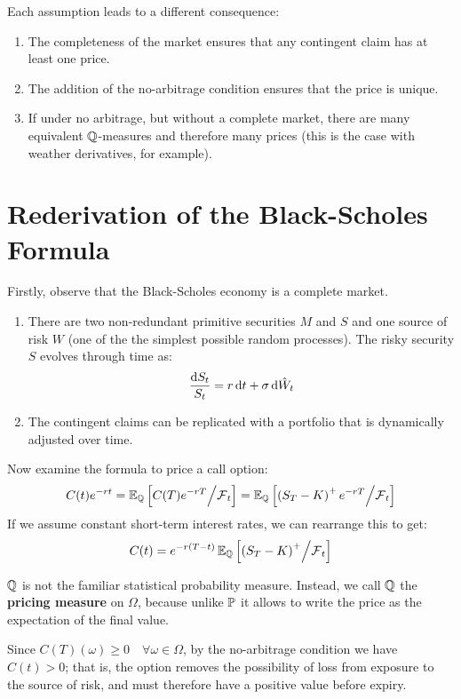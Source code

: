 \documentclass[11pt]{article}
\begin{document}
\begin{remark}
Each assumption leads to a different consequence:
\begin{enumerate}
\item The completeness of the market ensures that any contingent claim has at least one price.
\item The addition of the no-arbitrage condition ensures that the price is unique.
\item If under no arbitrage, but without a complete market, there are many equivalent $\operatorname{\mathbb Q}$-measures and therefore many prices (this is the case with weather derivatives, for example).
\end{enumerate}
\end{remark}

\section{Rederivation of the Black-Scholes Formula}
Firstly, observe that the Black-Scholes economy is a complete market. 
\begin{enumerate}
\item There are two non-redundant primitive securities $M$ and $S$ and one source of risk $W$ (one of the the simplest possible random processes). The risky security $S$ evolves through time as:
\begin{equation} \label{stock_price_process}
\frac{\dif S_t}{S_t} = r \dif t + \sigma \dif \hat{W}_t
\end{equation}
\item The contingent claims can be replicated with a portfolio that is dynamically adjusted over time.
\end{enumerate}
Now examine the formula to price a call option:
$$C(t)e^{-rt} = \operatorname{\mathbb E}_{\operatorname{\mathbb Q}}\left[ C(T)e^{-rT} \middle/ \operatorname{\mathcal F}_t \right] = \operatorname{\mathbb E}_{\operatorname{\mathbb Q}}\left[ \left(S_T-K\right)^+ e^{-rT} \middle/ \operatorname{\mathcal F}_t \right]$$
If we assume constant short-term interest rates, we can rearrange this to get:
$$C(t) = e^{-r(T-t)}\operatorname{\mathbb E}_{\operatorname{\mathbb Q}}\left[ \left(S_T-K\right)^+ \middle/ \operatorname{\mathcal F}_t \right]$$
\begin{remark}
 $\operatorname{\mathbb Q}$ is not the familiar statistical probability measure. Instead, we call $\operatorname{\mathbb Q}$ the {\bf pricing measure} on $\Omega$, because unlike $\operatorname{\mathbb P}$ it allows to write the price as the expectation of the final value.
\end{remark}
\begin{remark}
Since $C(T)(\omega) \geq 0  \quad \forall \omega \in \Omega$, by the no-arbitrage condition we have $C(t) > 0$; that is, the option removes the possibility of loss from exposure to the source of risk, and must therefore have a positive value before expiry.
\end{remark}
\end{document}
